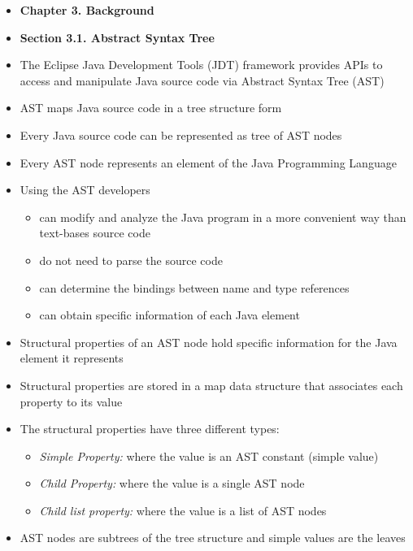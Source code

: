 \documentclass{article}
\newcommand{\bold}{\textbf}
\newcommand{\itt}{\textit}
\begin{document}
\begin{itemize} [leftmargin=.1in]
\item \bold{Chapter 3. Background}
\item \bold{Section 3.1. Abstract Syntax Tree}

\item The Eclipse Java Development Tools (JDT) framework provides APIs to access and manipulate Java source code via Abstract Syntax Tree (AST)
\item AST maps Java source code in a tree structure form
\item Every Java source code can be represented as tree of AST nodes
\item Every AST node represents an element of the Java Programming Language
\item Using the AST developers
\begin{itemize}
\item can modify and analyze the Java program in a more convenient way than text-bases source code
\item do not need to parse the source code
\item can determine the bindings between name and type references
\item can obtain specific information of each Java element
\end{itemize}
\item Structural properties of an AST node hold specific information for the Java element it represents
\item Structural properties are stored in a map data structure that associates each property to its value
\item The structural properties have three different types:
\begin{itemize} [leftmargin=.1in]
\item \itt{Simple Property:} where the value is an AST constant (simple value)
\item \itt{Child Property:} where the value is a single AST node
\item \itt{Child list property:} where the value is a list of AST nodes
\end{itemize}
\item AST nodes are subtrees of the tree structure and simple values are the leaves


\end{itemize}
\end{document}

